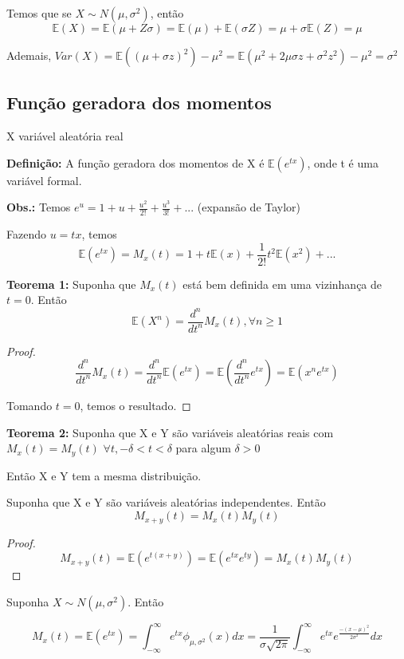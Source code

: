 Temos que se $X\sim N(\mu,\sigma^2)$, então
\[\mathbb{E}(X) = \mathbb{E}(\mu+Z\sigma) = \mathbb{E}(\mu) + \mathbb{E}(\sigma Z) = \mu + \sigma\mathbb{E}(Z) = \mu\]

Ademais, $Var(X) = \mathbb{E}((\mu+\sigma z)^2) - \mu^2 = \mathbb{E}(\mu^2+2\mu\sigma z + \sigma^2 z^2) - \mu^2 = \sigma^2$

\subsection{Função geradora dos momentos}
X variável aleatória real

\textbf{Definição:} A função geradora dos momentos de X é $\mathbb{E}(e^{tx})$, onde t é uma variável formal.

\textbf{Obs.:} Temos $e^u = 1 + u + \frac{u^2}{2!} + \frac{u^3}{3!} + ...$ (expansão de Taylor)

Fazendo $u=tx$, temos
\[\mathbb{E}(e^{tx}) = M_{x}(t) = 1 + t\mathbb{E}(x) + \frac{1}{2!}t^2\mathbb{E}(x^2) + ...\]

\textbf{Teorema 1:} Suponha que $M_{x}(t)$ está bem definida em uma vizinhança de $t=0$. Então
\[\mathbb{E}(X^n) = \frac{d^n}{dt^n}M_{x}(t), \forall n \geq 1\]

\begin{proof}
\[
\frac{d^n}{dt^n}M_{x}(t) = \frac{d^n}{dt^n}\mathbb{E}(e^{tx}) = \mathbb{E}(\frac{d^n}{dt^n}e^{tx}) = \mathbb{E}(x^n e^{tx})
\]

Tomando $t = 0$, temos o resultado.

\end{proof}

\textbf{Teorema 2:} Suponha que X e Y são variáveis aleatórias reais com $M_{x}(t) = M_{y}(t)$ $\forall t, -\delta < t < \delta$ para algum $\delta > 0$

Então X e Y tem a mesma distribuição.

Suponha que X e Y são variáveis aleatórias independentes. Então
\[M_{x+y}(t) = M_{x}(t)M_{y}(t)\]

\begin{proof}
\[M_{x+y}(t) = \mathbb{E}(e^{t(x+y)}) = \mathbb{E}(e^{tx}e^{ty}) = M_{x}(t)M_{y}(t)\]
\end{proof}

Suponha $X\sim N(\mu,\sigma^2)$. Então

\[M_{x}(t) = \mathbb{E}(e^{tx}) = \int_{-\infty}^\infty e^{tx}\phi_{\mu,\sigma^2}(x)dx = \frac{1}{\sigma\sqrt{2\pi}}\int_{-\infty}^\infty e^{tx}e^\frac{-(x-\mu)^2}{2\sigma^2}dx\]

